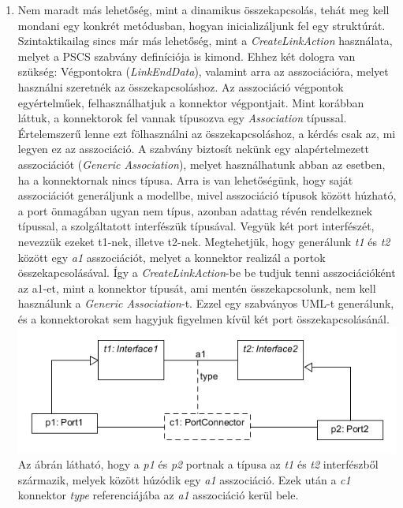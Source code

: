 \documentclass[a4paper,12pt]{report}
\begin{document}
\begin{enumerate}
\item Nem maradt más lehetőség, mint a dinamikus összekapcsolás, tehát meg kell mondani egy konkrét metódusban, hogyan inicializáljunk fel egy struktúrát. Szintaktikailag sincs már más lehetőség, mint a \textit{CreateLinkAction} használata, melyet a PSCS szabvány definíciója is kimond. Ehhez két dologra van szükség: Végpontokra (\textit{LinkEndData}), valamint arra az asszociációra, melyet használni szeretnék az összekapcsoláshoz. Az asszociáció végpontok egyértelműek, felhasználhatjuk a konnektor végpontjait. Mint korábban láttuk, a konnektorok fel vannak típusozva egy \textit{Association} típussal. Értelemszerű lenne ezt fölhasználni az összekapcsoláshoz, a kérdés csak az, mi legyen ez az asszociáció. A szabvány biztosít nekünk egy alapértelmezett asszociációt (\textit{Generic Association}), melyet használhatunk abban az esetben, ha a konnektornak nincs típusa. Arra is van lehetőségünk, hogy saját asszociációt generáljunk a modellbe, mivel asszociáció típusok között húzható, a port önmagában ugyan nem típus, azonban adattag révén rendelkeznek típussal, a szolgáltatott interfészük típusával. Vegyük két port interfészét, nevezzük ezeket t1-nek, illetve t2-nek.  Megtehetjük, hogy generálunk \textit{t1} és \textit{t2} között egy \textit{a1} asszociációt, melyet a konnektor realizál a portok összekapcsolásával. Így a \textit{CreateLinkAction}-be be tudjuk tenni asszociációként az a1-et, mint a konnektor típusát, ami mentén összekapcsolunk, nem kell használunk a \textit{Generic Association}-t. Ezzel egy szabványos UML-t generálunk, és a konnektorokat sem hagyjuk figyelmen kívül két port összekapcsolásánál. \\
\includegraphics[scale=0.8]{connect_type.png}
Az ábrán látható, hogy a \textit{p1} és \textit{p2} portnak a típusa az \textit{t1} és \textit{t2} interfészből származik, melyek között húzódik egy \textit{a1} asszociáció. Ezek után a \textit{c1} konnektor \textit{type} referenciájába az \textit{a1} asszociáció kerül bele. 
\end{enumerate}
\end{document}
